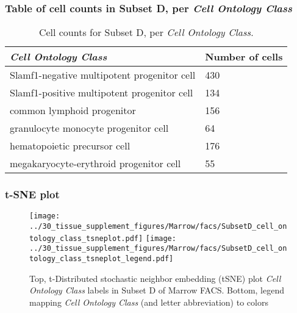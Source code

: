 \subsubsection{Table of cell counts in Subset D, per \emph{Cell Ontology Class}}\begin{table}[h]
\centering
\label{my-label}
\begin{tabular}{@{}ll@{}}
\toprule

\emph{Cell Ontology Class}& Number of cells \\ \midrule
Slamf1-negative multipotent progenitor cell & 430 \\

Slamf1-positive multipotent progenitor cell & 134 \\

common lymphoid progenitor & 156 \\

granulocyte monocyte progenitor cell & 64 \\

hematopoietic precursor cell & 176 \\

megakaryocyte-erythroid progenitor cell & 55 \\
\bottomrule
\end{tabular}
\caption{Cell counts for Subset D, per \emph{Cell Ontology Class}.}
\end{table}

\clearpage
\subsubsection{t-SNE plot}
\begin{figure}[h]
\centering
\texttt{[image: ../30\_tissue\_supplement\_figures/Marrow/facs/SubsetD\_cell\_ontology\_class\_tsneplot.pdf]}
\texttt{[image: ../30\_tissue\_supplement\_figures/Marrow/facs/SubsetD\_cell\_ontology\_class\_tsneplot\_legend.pdf]}
\caption{Top, t-Distributed stochastic neighbor embedding (tSNE) plot  \emph{Cell Ontology Class} labels in Subset D of Marrow FACS. Bottom, legend mapping \emph{Cell Ontology Class} (and letter abbreviation) to colors}
\end{figure}


\clearpage

